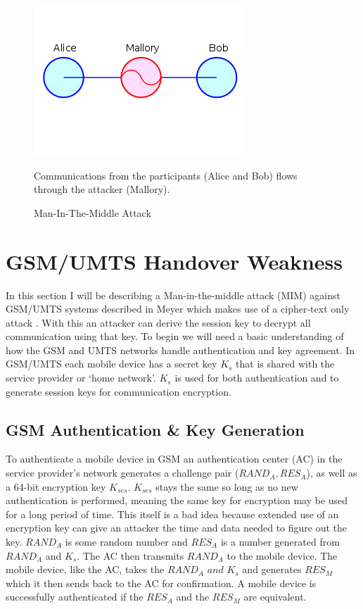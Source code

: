 \documentclass{sig-alternate}
\begin{document}
	\begin{figure}
		\centering
		\includegraphics[scale=.5, bb= 65 65 250 250]{MIM.jpg}
		\caption{Man-In-The-Middle Attack}
		 Communications from the participants (Alice and Bob) flows through the attacker (Mallory). 
		\label{MIM}
		\end{figure}

		
\section{GSM/UMTS Handover Weakness }

	In this section I  will be describing a Man-in-the-middle attack (MIM) against GSM/UMTS systems described in Meyer \cite{Meyer:2004} which makes use of a cipher-text only attack \cite{Barkan}. With this an attacker can derive the session key to decrypt all communication using that key. To begin we will need a basic understanding of how the GSM and UMTS networks handle authentication and key agreement. In GSM/UMTS each mobile device has a secret key $K_{s}$ that is shared with the service provider or `home network'. $K_{s}$ is used for both authentication and to generate session keys for communication encryption.     
	\subsection{GSM Authentication \& Key Generation} 
		To authenticate a mobile device in GSM an authentication center (AC) in the service provider's network generates a challenge pair ($\mathit{RAND_{A},RES_{A}}$), as well as a 64-bit encryption key  $K_{ses}$.  $K_{ses}$ stays the same so long as no new authentication is performed, meaning the same key for encryption may be used for a long period of time. This itself is a bad idea because extended use of an encryption key can give an attacker the time and data needed to figure out the key. $\mathit{RAND_{A}}$ is some random number and $\mathit{RES_{A}}$ is a number generated from $\mathit{RAND_{A}}$ and $K_{s}$. The AC then transmits $\mathit{RAND_{A}}$ to the mobile device. The mobile device, like the AC, takes the $\mathit{RAND_{A} \text{ and } K_{s}}$ and generates $\mathit{RES_{M}}$ which it then sends back to the AC for confirmation. A mobile device is successfully authenticated if the $\mathit{RES_{A}}$ and the $\mathit{RES_{M}}$ are equivalent.
		
\end{document}
